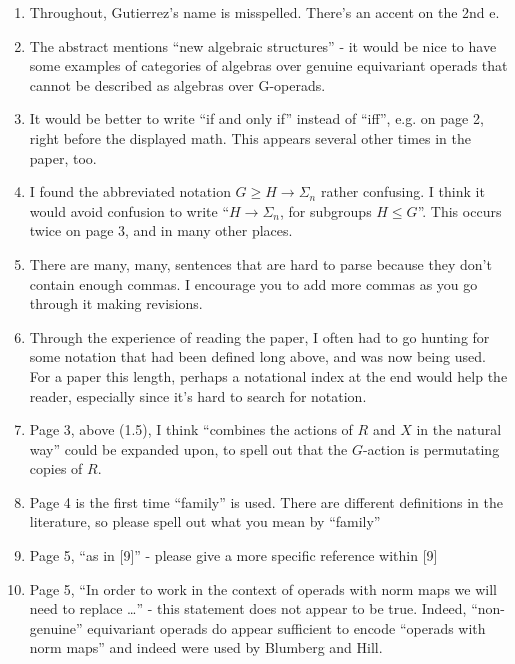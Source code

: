 \documentclass{article}
\begin{document}
\begin{enumerate}
	
	\item
	Throughout, Gutierrez's name is misspelled. There's an accent on the 2nd e.
	
	\item
	The abstract mentions ``new algebraic structures'' - it would be nice to have some examples of categories of algebras over genuine equivariant operads that cannot be described as algebras over G-operads.
	
	\item
	It would be better to write ``if and only if'' instead of ``iff'', e.g. on page 2, right before the displayed math. This appears several other times in the paper, too.
	
	\item
	I found the abbreviated notation $G \geq H \to \Sigma_n$ rather confusing. I think it would avoid confusion to write ``$H\to \Sigma_n$, for subgroups $H \leq G$''. This occurs twice on page 3, and in many other places.
	
	\item
	There are many, many, sentences that are hard to parse because they don't contain enough commas. I encourage you to add more commas as you go through it making revisions.
	
	\item
	Through the experience of reading the paper, I often had to go hunting for some notation that had been defined long above, and was now being used. For a paper this length, perhaps a notational index at the end would help the reader, especially since it's hard to search for notation.
	
	\item
	Page 3, above (1.5), I think ``combines the actions of $R$ and $X$ in the natural way'' could be expanded upon, to spell out that the $G$-action is permutating copies of $R$.
	
	\item
	Page 4 is the first time ``family'' is used. There are different definitions in the literature, so please spell out what you mean by ``family''
	
	\item
	Page 5, ``as in [9]'' - please give a more specific reference within [9]
	
	\item
	Page 5, ``In order to work in the context of operads with norm maps we will
	need to replace \dots'' - this statement does not appear to be true. Indeed, ``non-genuine'' equivariant operads do appear sufficient to encode ``operads with norm maps'' and indeed were used by Blumberg and Hill. 
	

\end{enumerate}
\end{document}
